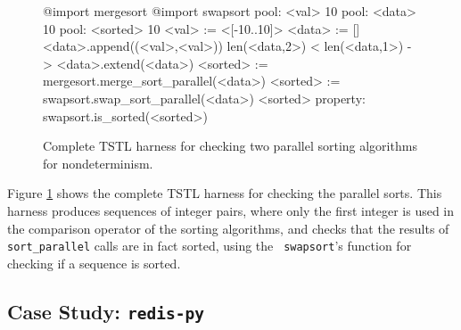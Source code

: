 \begin{figure}
{\scriptsize
\begin{code}
@import mergesort
@import swapsort
\vspace{0.1in}
pool: <val> 10
pool: <data> 10
pool: <sorted> 10
\vspace{0.1in}
<val> := <[-10..10]>
\vspace{0.1in}
<data> := []
<data>.append((<val>,<val>))
len(<data,2>) < len(<data,1>) -> <data>.extend(<data>)
\vspace{0.1in}
<sorted> := mergesort.merge\_sort\_parallel(<data>)
<sorted> := swapsort.swap\_sort\_parallel(<data>)
<sorted>
\vspace{0.1in}
property: swapsort.is\_sorted(<sorted>)
\end{code}
}
\caption {Complete TSTL harness for checking two parallel sorting
  algorithms for nondeterminism.}
\label{fig:parallelcode}
\end{figure}

Figure \ref{fig:parallelcode} shows the complete TSTL harness for
checking the parallel sorts.  This harness produces sequences of
integer pairs, where only the first integer is used in the comparison
operator of the sorting algorithms, and checks that the results of
{\tt sort\_parallel} calls are in fact sorted, using the {\tt
  swapsort}'s function for checking if a sequence is sorted.

\subsection {Case Study: {\tt redis-py}}


